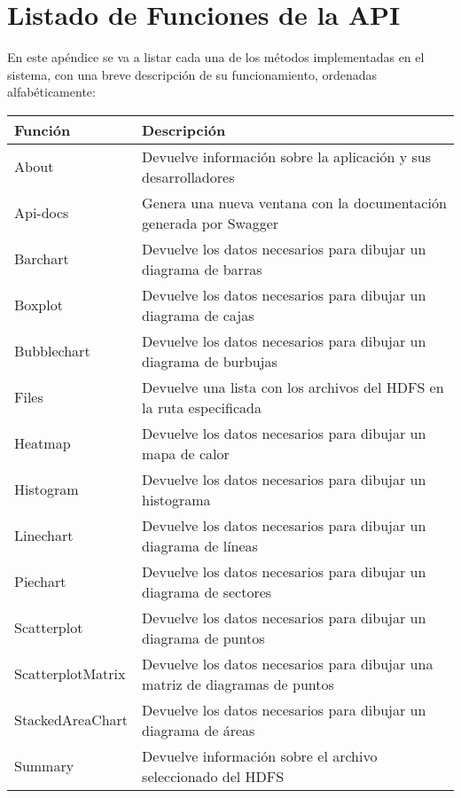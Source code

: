\appendix
\chapter{Listado de Funciones de la API}
En este apéndice se va a listar cada una de los métodos implementadas en el sistema, con una breve descripción de su funcionamiento, ordenadas alfabéticamente:

\begin{tabular}{|l|p{8cm}|}
	\hline 
	\textbf{Función} & \textbf{Descripción} \\ 
	\hline 
	About & Devuelve información sobre la aplicación y sus desarrolladores \\ 
	\hline 
	Api-docs & Genera una nueva ventana con la documentación generada por Swagger \\ 
	\hline 
	Barchart & Devuelve los datos necesarios para dibujar un diagrama de barras \\ 
	\hline 
	Boxplot & Devuelve los datos necesarios para dibujar un diagrama de cajas \\ 
	\hline 
	Bubblechart & Devuelve los datos necesarios para dibujar un diagrama de burbujas \\ 
	\hline 
	Files & Devuelve una lista con los archivos del HDFS en la ruta especificada  \\ 
	\hline 
	Heatmap & Devuelve los datos necesarios para dibujar un mapa de calor \\ 
	\hline 
	Histogram & Devuelve los datos necesarios para dibujar un histograma \\ 
	\hline 
	Linechart & Devuelve los datos necesarios para dibujar un diagrama de líneas \\ 
	\hline 
	Piechart & Devuelve los datos necesarios para dibujar un diagrama de sectores \\ 
	\hline 
	Scatterplot & Devuelve los datos necesarios para dibujar un diagrama de puntos \\ 
	\hline 
	ScatterplotMatrix & Devuelve los datos necesarios para dibujar una matriz de diagramas de puntos \\ 
	\hline 
	StackedAreaChart & Devuelve los datos necesarios para dibujar un diagrama de áreas \\ 
	\hline 
	Summary & Devuelve información sobre el archivo seleccionado del HDFS \\ 
	\hline 
\end{tabular} 
